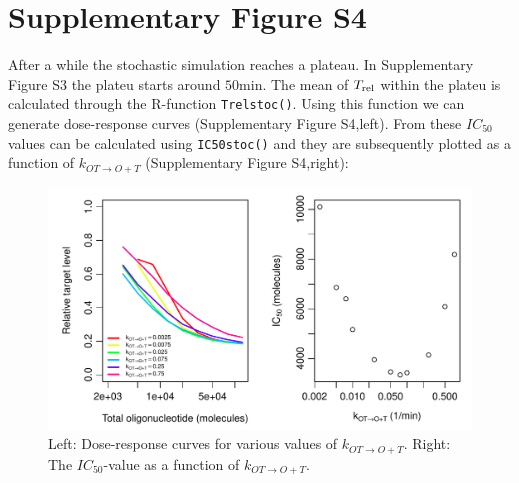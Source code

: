\documentclass[a4paper,11pt]{article}
\newenvironment{Ncenter}{%
  \setlength\topsep{-10pt}
  \setlength\parskip{-100pt}
  \begin{center}
}{%
  \end{center}
}
\newcommand{\kmo}{k_{OT \to O+T}}
\newcommand{\Trel}{T_{\rm{rel}}}
\begin{document}
\section{Supplementary Figure S4}
After a while the stochastic simulation reaches a plateau. In Supplementary Figure S3 the plateu starts around $50$min. The mean of $\Trel$ within the plateu is calculated through the R-function \texttt{Trelstoc()}. Using this function we can generate dose-response curves (Supplementary Figure S4,left). From these $IC_{50}$ values can be calculated using \texttt{IC50stoc()} and they are subsequently plotted as a function of $\kmo$ (Supplementary Figure S4,right):
\begin{Schunk}
\end{Schunk}
\begin{figure}[!h]
\begin{Ncenter}
\includegraphics[width=\textwidth]{SuppFile1-IC50.pdf}
\end{Ncenter}
\caption{Left: Dose-response curves for various values of $\kmo$. Right: The $IC_{50}$-value as a function of $\kmo$.}\label{fig:figIC50}
\end{figure}
\newpage

\end{document}
